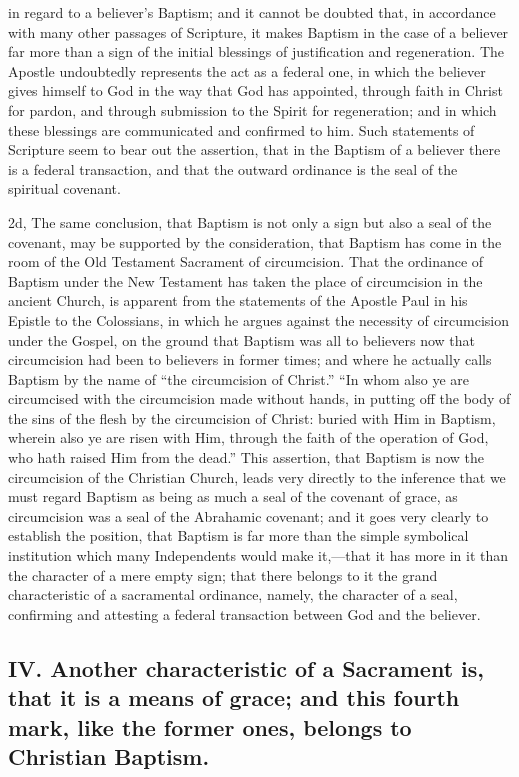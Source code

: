 \documentclass[]{book}
\begin{document}
in regard to a believer's Baptism; and it cannot be doubted that, in accordance with many other passages of Scripture, it makes Baptism in the case of a believer far more than a sign of the initial blessings of justification and regeneration. The Apostle undoubtedly represents the act as a federal one, in which the believer gives himself to God in the way that God has appointed, through faith in Christ for pardon, and through submission to the Spirit for regeneration; and in which these blessings are communicated and confirmed to him. Such statements of Scripture seem to bear out the assertion, that in the Baptism of a believer there is a federal transaction, and that the outward ordinance is the seal of the spiritual covenant.

2d, The same conclusion, that Baptism is not only a sign but also a seal of the covenant, may be supported by the consideration, that Baptism has come in the room of the Old Testament Sacrament of circumcision. That the ordinance of Baptism under the New Testament has taken the place of circumcision in the ancient Church, is apparent from the statements of the Apostle Paul in his Epistle to the Colossians, in which he argues against the necessity of circumcision under the Gospel, on the ground that Baptism was all to believers now that circumcision had been to believers in former times; and where he actually calls Baptism by the name of ``the circumcision of Christ.'' ``In whom also ye are circumcised with the circumcision made without hands, in putting off the body of the sins of the flesh by the circumcision of Christ: buried with Him in Baptism, wherein also ye are risen with Him, through the faith of the operation of God, who hath raised Him from the dead.'' This assertion, that Baptism is now the circumcision of the Christian Church, leads very directly to the inference that we must regard Baptism as being as much a seal of the covenant of grace, as circumcision was a seal of the Abrahamic covenant; and it goes very clearly to establish the position, that Baptism is far more than the simple symbolical institution which many Independents would make it,---that it has more in it than the character of a mere empty sign; that there belongs to it the grand characteristic of a sacramental ordinance, namely, the character of a seal, confirming and attesting a federal transaction between God and the believer.

\hypertarget{iv.-another-characteristic-of-a-sacrament-is-that-it-is-a-means-of-grace-and-this-fourth-mark-like-the-former-ones-belongs-to-christian-baptism.}{%
\subsection{IV. Another characteristic of a Sacrament is, that it is a means of grace; and this fourth mark, like the former ones, belongs to Christian Baptism.}\label{iv.-another-characteristic-of-a-sacrament-is-that-it-is-a-means-of-grace-and-this-fourth-mark-like-the-former-ones-belongs-to-christian-baptism.}}
\end{document}
